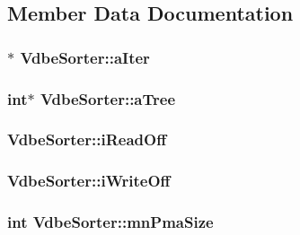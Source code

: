 \subsection{Member Data Documentation}
\hypertarget{struct_vdbe_sorter_a7c4748645307e20a863cc50ddb75abef}{
\subsubsection[{a\-Iter}]{$\ast$ Vdbe\-Sorter\-::a\-Iter}}\label{struct_vdbe_sorter_a7c4748645307e20a863cc50ddb75abef}
\hypertarget{struct_vdbe_sorter_a77ff5480e8adac1521775d2e8a7be04f}{
\subsubsection[{a\-Tree}]{\setlength{\rightskip}{0pt plus 5cm}int$\ast$ Vdbe\-Sorter\-::a\-Tree}}\label{struct_vdbe_sorter_a77ff5480e8adac1521775d2e8a7be04f}
\hypertarget{struct_vdbe_sorter_a5064ee91d2256d6176210b1556c13790}{
\subsubsection[{i\-Read\-Off}]{ Vdbe\-Sorter\-::i\-Read\-Off}}\label{struct_vdbe_sorter_a5064ee91d2256d6176210b1556c13790}
\hypertarget{struct_vdbe_sorter_a5024b3ed80ebd013cad0bc694c81f488}{
\subsubsection[{i\-Write\-Off}]{ Vdbe\-Sorter\-::i\-Write\-Off}}\label{struct_vdbe_sorter_a5024b3ed80ebd013cad0bc694c81f488}
\hypertarget{struct_vdbe_sorter_a6d201d0f496260f7f2c7f450cae5898b}{
\subsubsection[{mn\-Pma\-Size}]{\setlength{\rightskip}{0pt plus 5cm}int Vdbe\-Sorter\-::mn\-Pma\-Size}}\label{struct_vdbe_sorter_a6d201d0f496260f7f2c7f450cae5898b}
